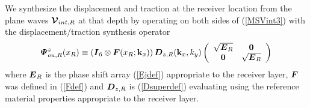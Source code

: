  We synthesize the displacement and traction at
the receiver location from the plane waves ${\mbox{\boldmath$\cal V$\unboldmath}}_{{int},R}$ at that
 depth by operating on both sides of (\ref{MSVint3}) with the 
 displacement/traction  synthesis operator
\begin{equation} \label{ThetazR}
{\mbox{\boldmath$\mit \Psi$\unboldmath}}^{z}_{ou,R}(x_R)\equiv \left({\mbox{\boldmath$\mit I$\unboldmath}}_6\otimes 
{\mbox{\boldmath$\mit F$\unboldmath}}(x_{R};{\bf k}_{x})\right){\mbox{\boldmath$\mit D$\unboldmath}}_{z,R}({\bf k}_{x},{k}_{y})
\left({\begin{array}{cc}
\sqrt{{\mbox{\boldmath$\mit E$\unboldmath}}_{R}}&{\bf 0}\\ 
{\bf 0}&\sqrt{{\mbox{\boldmath$\mit E$\unboldmath}}_{R}}
\end{array}}\right)
\end{equation}
where ${\mbox{\boldmath$\mit E$\unboldmath}}_{R}$ is the phase shift array (\ref{Ejdef}) appropriate to the 
receiver layer,
  ${{\mbox{\boldmath$\mit F$\unboldmath}}}$ was defined in (\ref{Fdef}) and ${\mbox{\boldmath$\mit D$\unboldmath}}_{z,R}$ is 
(\ref{Dsuperdef}) evaluating using the reference material properties appropriate to 
the receiver layer.



